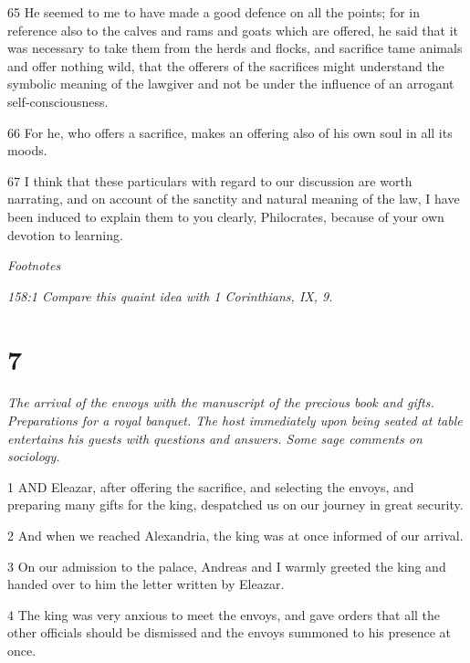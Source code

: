 \par 65 He seemed to me to have made a good defence on all the points; for in reference also to the calves and rams and goats which are offered, he said that it was necessary to take them from the herds and flocks, and sacrifice tame animals and offer nothing wild, that the offerers of the sacrifices might understand the symbolic meaning of the lawgiver and not be under the influence of an arrogant self-consciousness.

\par 66 For he, who offers a sacrifice, makes an offering also of his own soul in all its moods.

\par 67 I think that these particulars with regard to our discussion are worth narrating, and on account of the sanctity and natural meaning of the law, I have been induced to explain them to you clearly, Philocrates, because of your own devotion to learning.

\par \textit{Footnotes}

\par \textit{158:1 Compare this quaint idea with 1 Corinthians, IX, 9.}

\chapter{7}

\par \textit{The arrival of the envoys with the manuscript of the precious book and gifts. Preparations for a royal banquet. The host immediately upon being seated at table entertains his guests with questions and answers. Some sage comments on sociology.}

\par 1 AND Eleazar, after offering the sacrifice, and selecting the envoys, and preparing many gifts for the king, despatched us on our journey in great security.

\par 2 And when we reached Alexandria, the king was at once informed of our arrival.

\par 3 On our admission to the palace, Andreas and I warmly greeted the king and handed over to him the letter written by Eleazar.

\par 4 The king was very anxious to meet the envoys, and gave orders that all the other officials should be dismissed and the envoys summoned to his presence at once.

